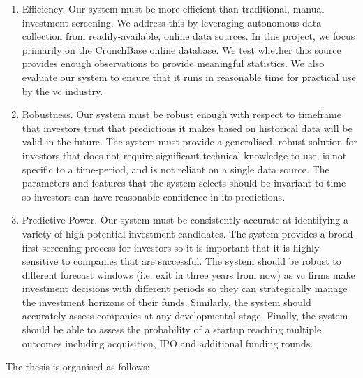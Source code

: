 \documentclass[../thesis/thesis.tex]{subfiles}
\begin{document}
\begin{enumerate}

\item Efficiency. Our system must be more efficient than traditional, manual investment screening. We address this by leveraging autonomous data collection from readily-available, online data sources. In this project, we focus primarily on the CrunchBase online database. We test whether this source provides enough observations to provide meaningful statistics. We also evaluate our system to ensure that it runs in reasonable time for practical use by the \gls{vc} industry.

\item Robustness. Our system must be robust enough with respect to timeframe that investors trust that predictions it makes based on historical data will be valid in the future. The system must provide a generalised, robust solution for investors that does not require significant technical knowledge to use, is not specific to a time-period, and is not reliant on a single data source. The parameters and features that the system selects should be invariant to time so investors can have reasonable confidence in its predictions.

\item Predictive Power. Our system must be consistently accurate at identifying a variety of high-potential investment candidates. The system provides a broad first screening process for investors so it is important that it is highly sensitive to companies that are successful. The system should be robust to different forecast windows (i.e. exit in three years from now) as \gls{vc} firms make investment decisions with different periods so they can strategically manage the investment horizons of their funds. Similarly, the system should accurately assess companies at any developmental stage. Finally, the system should be able to assess the probability of a startup reaching multiple outcomes including acquisition, IPO and additional funding rounds.

\end{enumerate}

The thesis is organised as follows:
\end{document}
